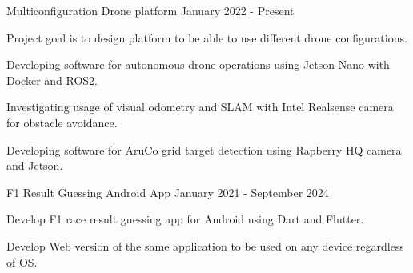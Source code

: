 

\begin{cventries}

  \cventry
    {Multiconfiguration Drone platform}
    {}
    {} %
    {January 2022 - Present} %
    {
      \begin{cvitems} %
        \item {Project goal is to design platform to be able to use different drone configurations.}
        \item {Developing software for autonomous drone operations using Jetson Nano with Docker and ROS2.}
        \item {Investigating usage of visual odometry and SLAM with Intel Realsense camera for obstacle avoidance.}
        \item {Developing software for AruCo grid target detection using Rapberry HQ camera and Jetson.}
      \end{cvitems}
    }
  \cventry
    {F1 Result Guessing Android App}
    {}
    {} %
    {January 2021 - September 2024} %
    {
      \begin{cvitems} %
      \item {Develop F1 race result guessing app for Android using Dart and Flutter.}
      \item {Develop Web version of the same application to be used on any device regardless of OS.}
      \end{cvitems}
    }

\end{cventries}
